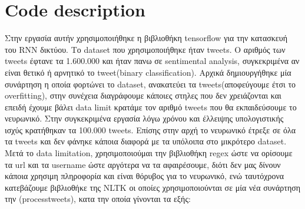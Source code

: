 \section{Code description}
Στην εργασία αυτήν χρησιμοποιήθηκε η βιβλιοθήκη tensorflow για την κατασκευή του RNN δικτύου. Το dataset που χρησιμοποιήθηκε ήταν tweets. Ο αριθμός των tweets έφτανε τα 1.600.000 και ήταν πανω σε sentimental analysis, συγκεκριμένα αν είναι θετικό ή αρνητικό το tweet(binary classification).
Αρχικά δημιουργήθηκε μία συνάρτηση η οποία φορτώνει το dataset, ανακατεύει τα tweets(αποφεύγουμε έτσι το overfitting), στην συνέχεια διαγράφουμε κάποιες στηλες που δεν χρειάζονται και επειδή έχουμε βάλει data limit κρατάμε τον αριθμό tweets που θα εκπαιδεύσουμε το νευρωνικό.
Στην συγκεκριμένα εργασία λόγω χρόνου και έλλειψης υπολογιστικής ισχύς κρατήθηκαν τα 100.000 tweets. Επίσης στην αρχή το νευρωνικό έτρεξε σε όλα τα tweets και δεν φάνηκε κάποια διαφορά με τα υπόλοιπα στο μικρότερο dataset. Μετά το data limitation, χρησιμοποιούμαι την βιβλιοθήκη regex ώστε να ορίσουμε τα url και τα username ώστε αργότερα να τα αφαιρέσουμε, διότι δεν μας δίνουν κάποια χρησιμη πληροφορία και είναι θόρυβος για το νευρωνικό, ενώ ταυτόχρονα κατεβάζουμε βιβλιοθήκε της NLTK οι οποίες χρησιμοποιούνται σε μία νέα συνάρτηση την (processtweets), κατα την οποία γίνονται τα εξής:
